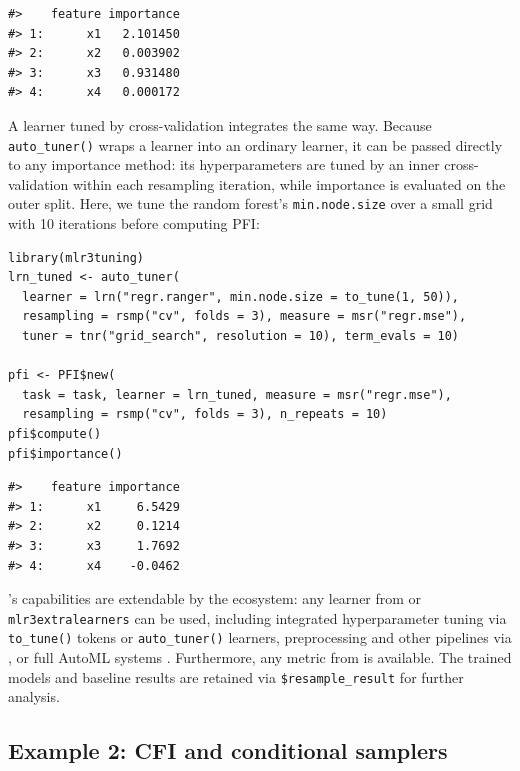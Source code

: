 \begin{verbatim}
#>    feature importance
#> 1:      x1   2.101450
#> 2:      x2   0.003902
#> 3:      x3   0.931480
#> 4:      x4   0.000172
\end{verbatim}

A learner tuned by cross-validation integrates the same way.
Because \texttt{auto\_tuner()} wraps a learner into an ordinary  learner, it can be passed directly to any importance method: its hyperparameters are tuned by an inner cross-validation within each resampling iteration, while importance is evaluated on the outer split.
Here, we tune the random forest's \texttt{min.node.size} over a small grid with 10 iterations before computing PFI:

\begin{verbatim}
library(mlr3tuning)
lrn_tuned <- auto_tuner(
  learner = lrn("regr.ranger", min.node.size = to_tune(1, 50)),
  resampling = rsmp("cv", folds = 3), measure = msr("regr.mse"),
  tuner = tnr("grid_search", resolution = 10), term_evals = 10)

pfi <- PFI$new(
  task = task, learner = lrn_tuned, measure = msr("regr.mse"),
  resampling = rsmp("cv", folds = 3), n_repeats = 10)
pfi$compute()
pfi$importance()
\end{verbatim}

\begin{verbatim}
#>    feature importance
#> 1:      x1     6.5429
#> 2:      x2     0.1214
#> 3:      x3     1.7692
#> 4:      x4    -0.0462
\end{verbatim}

's capabilities are extendable by the  ecosystem: any learner from  or \texttt{mlr3extralearners} \citep{fischer2025mlr3extralearnersexpanding} can be used, including integrated hyperparameter tuning via \texttt{to\_tune()} tokens or \texttt{auto\_tuner()} learners, preprocessing and other pipelines via , or full AutoML systems \citep{mlr3bookadvancedtuning, mlr3bookpipelinestuning}.
Furthermore, any metric from  is available.
The trained models and baseline results are retained via \texttt{\$resample\_result} for further analysis.

\subsection{Example 2: CFI and conditional samplers}\label{example-2-cfi-and-conditional-samplers}

